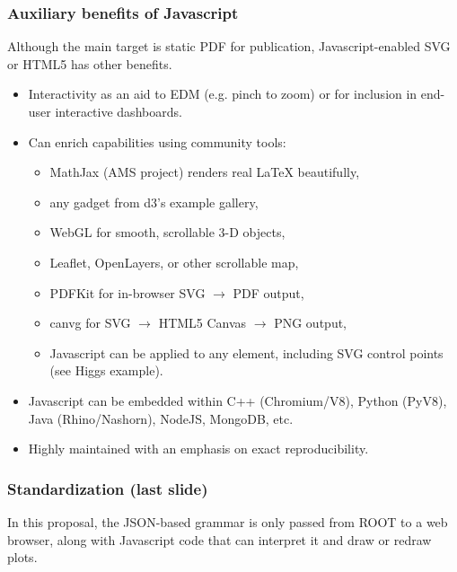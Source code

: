 \documentclass[compress]{beamer}
\begin{document}
\begin{frame}
\frametitle{Auxiliary benefits of Javascript}

Although the main target is static PDF for publication, Javascript-enabled SVG or HTML5 has other benefits.

\begin{itemize}
\item Interactivity as an aid to EDM (e.g. pinch to zoom) or for inclusion in end-user interactive dashboards.
\item Can enrich capabilities using community tools:
\begin{itemize}
  \item MathJax (AMS project) renders real LaTeX beautifully,
  \item any gadget from d3's example gallery,
  \item WebGL for smooth, scrollable 3-D objects,
  \item Leaflet, OpenLayers, or other scrollable map,
  \item PDFKit for in-browser SVG $\to$ PDF output,
  \item canvg for SVG $\to$ HTML5 Canvas $\to$ PNG output,
  \item Javascript can be applied to any element, including SVG control points (see Higgs example).
\end{itemize}
\item Javascript can be embedded within C++ (Chromium/V8), Python (PyV8), Java (Rhino/Nashorn), NodeJS, MongoDB, etc.
\item Highly maintained with an emphasis on exact reproducibility.
\end{itemize}
\end{frame}

\begin{frame}
\frametitle{Standardization (last slide)}

In this proposal, the JSON-based grammar is only passed from ROOT to a web browser, along with Javascript code that can interpret it and draw or redraw plots.

\vspace{0.4 cm}

\vspace{0.4 cm}

\vspace{0.4 cm}
\end{frame}
\end{document}
